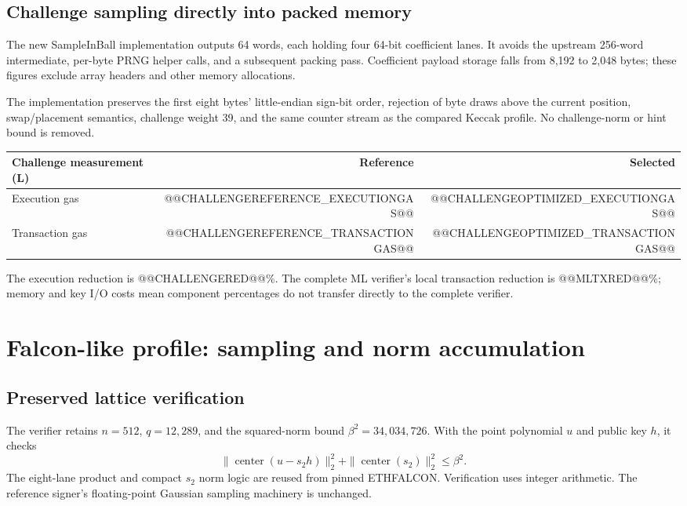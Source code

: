 \documentclass[11pt,a4paper]{article}
\newcommand{\local}{\textbf{L}}
\begin{document}
\subsection{Challenge sampling directly into packed memory}
The new SampleInBall implementation outputs 64 words, each holding four
64-bit coefficient lanes. It avoids the upstream 256-word intermediate,
per-byte PRNG helper calls, and a subsequent packing pass. Coefficient payload
storage falls from 8,192 to 2,048 bytes; these figures exclude array headers
and other memory allocations.

The implementation preserves the first eight bytes' little-endian sign-bit
order, rejection of byte draws above the current position, swap/placement
semantics, challenge weight 39, and the same counter stream as the compared
Keccak profile. No challenge-norm or hint bound is removed.

\begin{tabularx}{\linewidth}{Yrr}
\toprule
\textbf{Challenge measurement (\local)} & \textbf{Reference} & \textbf{Selected}\\
\midrule
Execution gas & @@CHALLENGEREFERENCE_EXECUTIONGAS@@ & @@CHALLENGEOPTIMIZED_EXECUTIONGAS@@\\
Transaction gas & @@CHALLENGEREFERENCE_TRANSACTIONGAS@@ & @@CHALLENGEOPTIMIZED_TRANSACTIONGAS@@\\
\bottomrule
\end{tabularx}
The execution reduction is @@CHALLENGERED@@\%. The complete ML verifier's
local transaction reduction is @@MLTXRED@@\%; memory and key I/O costs mean
component percentages do not transfer directly to the complete verifier.

\newpage
\section{Falcon-like profile: sampling and norm accumulation}
\subsection{Preserved lattice verification}
The verifier retains $n=512$, $q=12{,}289$, and the squared-norm bound
$\beta^2=34{,}034{,}726$. With the point polynomial $u$ and public key $h$,
it checks
\begin{equation}
 \|\operatorname{center}(u-s_2h)\|_2^2+
 \|\operatorname{center}(s_2)\|_2^2\leq\beta^2.
\end{equation}
The eight-lane product and compact $s_2$ norm logic are reused from pinned
ETHFALCON. Verification uses integer arithmetic. The reference signer's
floating-point Gaussian sampling machinery is unchanged.
\end{document}

